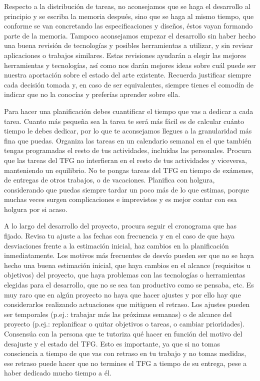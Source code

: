 Respecto a la distribución de tareas, no aconsejamos que se haga el desarrollo al principio y se escriba la memoria después, sino que se haga al mismo tiempo, que conforme se van concretando las especificaciones y diseños, éstos vayan formando parte de la memoria. Tampoco aconsejamos empezar el desarrollo sin haber hecho una buena revisión de tecnologías y posibles herramientas a utilizar, y sin revisar aplicaciones o trabajos similares. Estas revisiones ayudarán a elegir las mejores herramientas y tecnologías, así como nos darán mejores ideas sobre cuál puede ser nuestra aportación sobre el estado del arte existente. Recuerda justificar siempre cada decisión tomada y, en caso de ser equivalentes, siempre tienes el comodín de indicar que no la conocías y preferías aprender sobre ella.

Para hacer una planificación debes cuantificar el tiempo que vas a dedicar a cada tarea. Cuanto más pequeña sea la tarea te será más fácil es de calcular cuánto tiempo le debes dedicar, por lo que te aconsejamos llegues a la granularidad más fina que puedas. Organiza las tareas en un calendario semanal en el que también tengas programadas el resto de tus actividades, incluidas las personales. Procura que las tareas del TFG no interfieran en el resto de tus actividades y viceversa, manteniendo un equilibrio. No te pongas tareas del TFG en tiempo de exámenes, de entregas de otros trabajos, o de vacaciones. Planifica con holgura, considerando que puedas siempre tardar un poco más de lo que estimas, porque muchas veces surgen complicaciones e imprevistos y es mejor contar con esa holgura por si acaso.

A lo largo del desarrollo del proyecto, procura seguir el cronograma que has fijado. Revisa tu ajuste a las fechas con frecuencia y en el caso de que haya desviaciones frente a la estimación inicial, haz cambios en la planificación inmediatamente. Los motivos más frecuentes de desvío pueden ser que no se haya hecho una buena estimación inicial, que haya cambios en el alcance (requisitos u objetivos) del proyecto, que haya problemas con las tecnologías o herramientas elegidas para el desarrollo, que no se sea tan productivo como se pensaba, etc. Es muy raro que en algún proyecto no haya que hacer ajustes y por ello hay que considerarlos realizando actuaciones que mitiguen el retraso. Los ajustes pueden ser temporales (p.ej.: trabajar más las próximas semanas) o de alcance del proyecto (p.ej.: replanificar o quitar objetivos o tareas, o cambiar prioridades). Consensúa con la persona que te tutoriza qué hacer en función del motivo del desajuste y el estado del TFG. Esto es importante, ya que si no tomas consciencia a tiempo de que vas con retraso en tu trabajo y no tomas medidas, ese retraso puede hacer que no termines el TFG a tiempo de su entrega, pese a haber dedicado mucho tiempo a él. 

